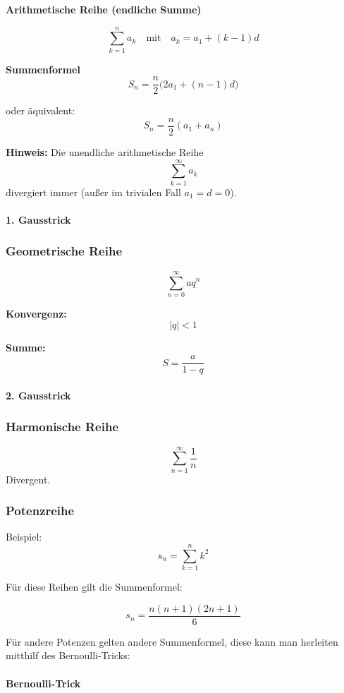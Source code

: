     \textbf{Arithmetische Reihe (endliche Summe)}
    
    \[
    \sum_{k=1}^{n} a_k
    \quad \text{mit} \quad
    a_k = a_1 + (k-1)d
    \]
    
    \textbf{Summenformel}
    \[
    S_n = \frac{n}{2}\bigl(2a_1 + (n-1)d\bigr)
    \]
    
    oder äquivalent:
    \[
    S_n = \frac{n}{2}(a_1 + a_n)
    \]
    
    \textbf{Hinweis:}
    Die unendliche arithmetische Reihe
    \[
    \sum_{k=1}^{\infty} a_k
    \]
    divergiert immer (außer im trivialen Fall $a_1 = d = 0$).
    
    \paragraph{1. Gausstrick}
    
    \subsubsection{Geometrische Reihe}
    \[
    \sum_{n=0}^{\infty} a q^n
    \]
    
    \textbf{Konvergenz:}
    \[
    |q| < 1
    \]
    
    \textbf{Summe:}
    \[
    S = \frac{a}{1-q}
    \]
    
    \paragraph{2. Gausstrick}
    
    \subsubsection{Harmonische Reihe}
    \[
    \sum_{n=1}^{\infty} \frac{1}{n}
    \]
    Divergent.
    
    \subsubsection{Potenzreihe}
    Beispiel:
    $$s_n=\sum_{k=1}^{n}k^2$$
    
    Für diese Reihen gilt die Summenformel:
    
    $$s_n=\frac{n(n+1)(2n+1)}{6}$$
    
    Für andere Potenzen gelten andere Summenformel, diese kann man herleiten mitthilf des Bernoulli-Tricks:
    
    \paragraph{Bernoulli-Trick}
    
